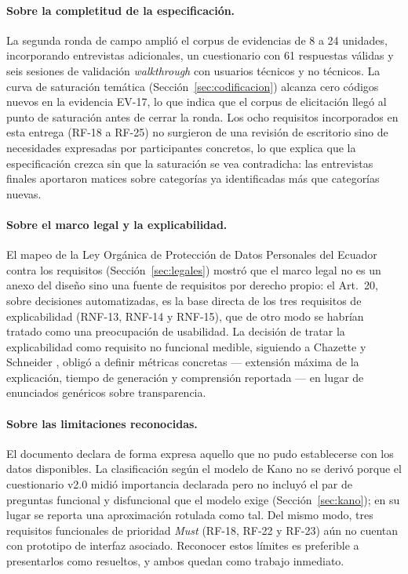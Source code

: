 \documentclass[journal,onecolumn]{IEEEtran}
\begin{document}
	\paragraph{Sobre la completitud de la especificación.}
	La segunda ronda de campo amplió el corpus de evidencias de 8 a 24 unidades,
	incorporando entrevistas adicionales, un cuestionario con 61 respuestas
	válidas y seis sesiones de validación \emph{walkthrough} con usuarios
	técnicos y no técnicos. La curva de saturación temática
	(Sección~\ref{sec:codificacion}) alcanza cero códigos nuevos en la evidencia
	EV-17, lo que indica que el corpus de elicitación llegó al punto de
	saturación antes de cerrar la ronda. Los ocho requisitos incorporados en esta
	entrega (RF-18 a RF-25) no surgieron de una revisión de escritorio sino de
	necesidades expresadas por participantes concretos, lo que explica que la
	especificación crezca sin que la saturación se vea contradicha: las
	entrevistas finales aportaron matices sobre categorías ya identificadas más
	que categorías nuevas.
	
	\paragraph{Sobre el marco legal y la explicabilidad.}
	El mapeo de la Ley Orgánica de Protección de Datos Personales del Ecuador
	\cite{lopdp2021} contra los requisitos (Sección~\ref{sec:legales}) mostró que
	el marco legal no es un anexo del diseño sino una fuente de requisitos por
	derecho propio: el Art.~20, sobre decisiones automatizadas, es la base
	directa de los tres requisitos de explicabilidad (RNF-13, RNF-14 y RNF-15),
	que de otro modo se habrían tratado como una preocupación de usabilidad. La
	decisión de tratar la explicabilidad como requisito no funcional medible,
	siguiendo a Chazette y Schneider \cite{chazette2020}, obligó a definir
	métricas concretas --- extensión máxima de la explicación, tiempo de
	generación y comprensión reportada --- en lugar de enunciados genéricos sobre
	transparencia.
	
	\paragraph{Sobre las limitaciones reconocidas.}
	El documento declara de forma expresa aquello que no pudo establecerse con
	los datos disponibles. La clasificación según el modelo de Kano no se derivó
	porque el cuestionario v2.0 midió importancia declarada pero no incluyó el
	par de preguntas funcional y disfuncional que el modelo exige
	(Sección~\ref{sec:kano}); en su lugar se reporta una aproximación rotulada
	como tal. Del mismo modo, tres requisitos funcionales de prioridad
	\emph{Must} (RF-18, RF-22 y RF-23) aún no cuentan con prototipo de interfaz
	asociado. Reconocer estos límites es preferible a presentarlos como
	resueltos, y ambos quedan como trabajo inmediato.
	
\end{document}
